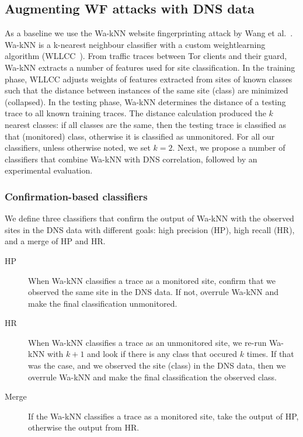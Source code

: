 \subsection{Augmenting WF attacks with DNS data}
As a baseline we use the Wa-kNN website fingerprinting attack by
Wang et al.~\cite{Wang2014a}. Wa-kNN is a k-nearest neighbour classifier with
a custom weightlearning algorithm (WLLCC~\cite{WangThesis}). From traffic traces
between Tor clients and their guard, Wa-kNN extracts a number of features used
for site classification.
In the training phase, WLLCC adjusts weights of features extracted from sites
of known classes such that the distance between instances of the same site (class) are minimized (collapsed).
In the testing phase, Wa-kNN determines the distance of a testing trace to all
known training traces. The distance calculation produced the $k$ nearest
classes: if all classes are the same, then the testing trace is classified as
that (monitored) class, otherwise it is classified as unmonitored.
For all our classifiers, unless otherwise noted, we set $k=2$. Next, we propose
a number of classifiers that combine Wa-kNN with DNS correlation, followed by
an experimental evaluation.

\subsubsection{Confirmation-based classifiers}
We define three classifiers that confirm the output of Wa-kNN with the observed
sites in the DNS data with different goals: high precision (HP), high
 recall (HR), and a merge of HP and HR.

 \begin{description}
 	\item[HP] When Wa-kNN classifies a trace as a monitored site, confirm
	that we observed the same site in the DNS data. If not, overrule Wa-kNN and
	make the final classification unmonitored.
	\item[HR] When Wa-kNN classifies a trace as an unmonitored site, we re-run
	Wa-kNN with $k+1$ and look if there is any class that occured $k$ times.
	If that was the case, and we observed the site (class) in the DNS data,
	then we overrule Wa-kNN and make the final classification the observed class.
	\item[Merge] If the Wa-kNN classifies a trace as a monitored site, take the
	output of HP, otherwise the output from HR.
 \end{description}

